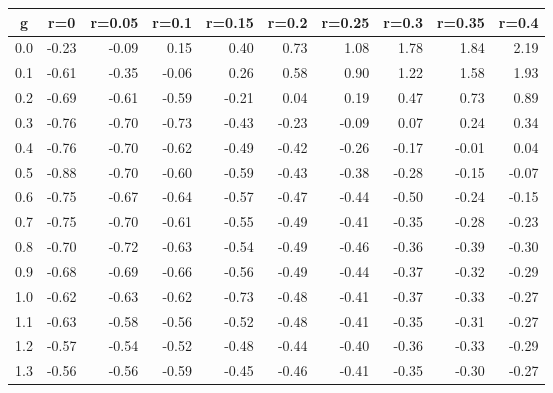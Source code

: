 %
\begin{table}[!tbp]
 \begin{center}
 \begin{tabular}{rrrrrrrrrr}\hline\hline
\multicolumn{1}{c}{g}&\multicolumn{1}{c}{r=0}&\multicolumn{1}{c}{r=0.05}&\multicolumn{1}{c}{r=0.1}&\multicolumn{1}{c}{r=0.15}&\multicolumn{1}{c}{r=0.2}&\multicolumn{1}{c}{r=0.25}&\multicolumn{1}{c}{r=0.3}&\multicolumn{1}{c}{r=0.35}&\multicolumn{1}{c}{r=0.4}\tabularnewline
\hline
0.0&-0.23&-0.09& 0.15& 0.40& 0.73& 1.08& 1.78& 1.84& 2.19\tabularnewline
0.1&-0.61&-0.35&-0.06& 0.26& 0.58& 0.90& 1.22& 1.58& 1.93\tabularnewline
0.2&-0.69&-0.61&-0.59&-0.21& 0.04& 0.19& 0.47& 0.73& 0.89\tabularnewline
0.3&-0.76&-0.70&-0.73&-0.43&-0.23&-0.09& 0.07& 0.24& 0.34\tabularnewline
0.4&-0.76&-0.70&-0.62&-0.49&-0.42&-0.26&-0.17&-0.01& 0.04\tabularnewline
0.5&-0.88&-0.70&-0.60&-0.59&-0.43&-0.38&-0.28&-0.15&-0.07\tabularnewline
0.6&-0.75&-0.67&-0.64&-0.57&-0.47&-0.44&-0.50&-0.24&-0.15\tabularnewline
0.7&-0.75&-0.70&-0.61&-0.55&-0.49&-0.41&-0.35&-0.28&-0.23\tabularnewline
0.8&-0.70&-0.72&-0.63&-0.54&-0.49&-0.46&-0.36&-0.39&-0.30\tabularnewline
0.9&-0.68&-0.69&-0.66&-0.56&-0.49&-0.44&-0.37&-0.32&-0.29\tabularnewline
1.0&-0.62&-0.63&-0.62&-0.73&-0.48&-0.41&-0.37&-0.33&-0.27\tabularnewline
1.1&-0.63&-0.58&-0.56&-0.52&-0.48&-0.41&-0.35&-0.31&-0.27\tabularnewline
1.2&-0.57&-0.54&-0.52&-0.48&-0.44&-0.40&-0.36&-0.33&-0.29\tabularnewline
1.3&-0.56&-0.56&-0.59&-0.45&-0.46&-0.41&-0.35&-0.30&-0.27\tabularnewline
\hline
\end{tabular}

\end{center}

\end{table}

